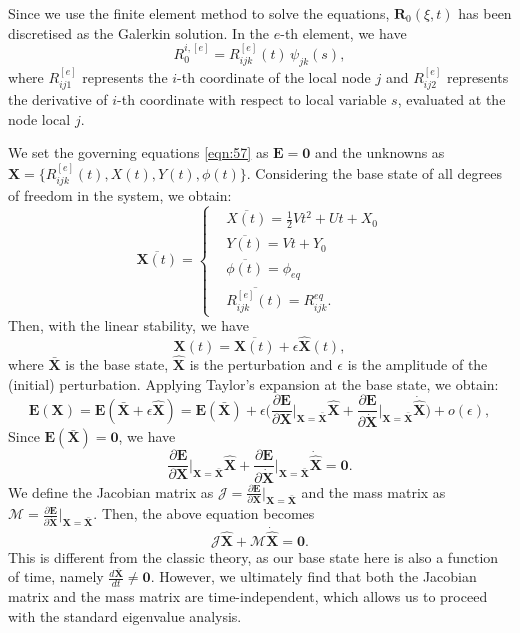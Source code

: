 \documentclass[a4paper,12pt]{report}
\begin{document}
Since we use the finite element method to solve the equations, $\textbf{R}_0(\xi,t)$ has been discretised as the Galerkin solution. In the $e$-th element, we have
\begin{equation}
	\label{eqn:108}
R_0^{i,[e]}=R_{ijk}^{[e]}(t)\, \psi_{jk}(s),
\end{equation}
where $R_{ij1}^{[e]}$ represents the $i$-th coordinate of the local node $j$ and $R_{ij2}^{[e]}$ represents the derivative of $i$-th coordinate with respect to local variable $s$, evaluated at the node local $j$.

We set the governing equations \eqref{eqn:57} as $\bm{E}=\bm{0}$ and the unknowns as $\bm{X}=\{R_{ijk}^{[e]}(t),X(t), Y(t),\phi(t)\}$. Considering the base state of all degrees of freedom in the system, we obtain:
\begin{equation}
	\label{eqn:112}
	\overline{\bm{X}(t)}=\left\{\begin{aligned}
		&\overline{X(t)}=\frac{1}{2}Vt^2+Ut+X_{0} \\
		&\overline{Y(t)}=Vt+Y_{0} \\
		&\overline{\phi(t)}=\phi_{eq} \\
		&\overline{R_{ijk}^{[e]}(t)}=R_{ijk}^{eq}.
	\end{aligned}\right.	
\end{equation}
Then, with the linear stability, we have 
\begin{equation}
	\label{eqn:123}
    \bm{X}(t)=\overline{\bm{X}(t)}+\epsilon \hat{\bm{X}}(t),
\end{equation}
where $\bar{\bm{X}}$ is the base state, $\hat{\bm{X}}$ is the perturbation and $\epsilon$ is the amplitude of the (initial) perturbation.
Applying Taylor's expansion at the base state, we obtain:
\begin{equation}
	\label{eqn:109}
\bm{E}(\bm{X})=\bm{E}(\bar{\bm{X}}+\epsilon \hat{\bm{X}})=\bm{E}(\bar{\bm{X}})+\epsilon \Big(\frac{\partial \bm{E}}{\partial \bm{X}}\Big|_{\bm{X}=\bar{\bm{X}}}\hat{\bm{X}}+\frac{\partial \bm{E}}{\partial \dot{\bm{X}}}\Big|_{\bm{X}=\bar{\bm{X}}}\dot{\hat{\bm{X}}}\Big)+o(\epsilon),
\end{equation}
 Since $\bm{E}(\bar{\bm{X}})=\bm{0}$, we have 
\begin{equation}
	\label{eqn:110}
	\frac{\partial \bm{E}}{\partial \bm{X}}\Big|_{\bm{X}=\bar{\bm{X}}}\hat{\bm{X}}+\frac{\partial \bm{E}}{\partial \dot{\bm{X}}}\Big|_{\bm{X}=\bar{\bm{X}}}\dot{\hat{\bm{X}}}=\bm{0}.
\end{equation}
We define the Jacobian matrix as $\bm{\mathcal{J}}=\frac{\partial \bm{E}}{\partial \bm{X}}\Big|_{\bm{X}=\bar{\bm{X}}}$ and the mass matrix as $\bm{\mathcal{M}}=\frac{\partial \bm{E}}{\partial \dot{\bm{X}}}\Big|_{\bm{X}=\bar{\bm{X}}}$. Then, the above equation becomes 
\begin{equation}
	\label{eqn:111}
\bm{\mathcal{J}}\hat{\bm{X}}+\bm{\mathcal{M}}\dot{\hat{\bm{X}}}=\bm{0}.
\end{equation}
This is different from the classic theory, as our base state here is also a function of time, namely $\frac{d\bar{\bm{X}}}{dt}\neq\bm{0}$. However, we ultimately find that both the Jacobian matrix and the mass matrix are time-independent, which allows us to proceed with the standard eigenvalue analysis.
\end{document}
